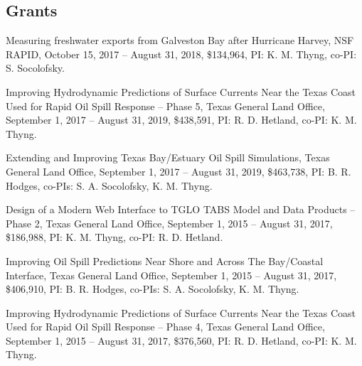 \documentclass[10pt,letterpaper]{article}
\renewenvironment{itemize}{
  \begin{list}{}{
    \setlength{\leftmargin}{1.5em}
    \setlength{\itemsep}{0.25em}
    \setlength{\parskip}{0pt}
    \setlength{\parsep}{0.25em}
  }
}{
  \end{list}
}
\begin{document}
\subsection*{Grants}
\begin{itemize}
  \item Measuring freshwater exports from Galveston Bay after Hurricane Harvey, NSF RAPID, October 15, 2017 -- August 31, 2018, \$134,964, PI: K. M. Thyng, co-PI: S. Socolofsky.
\item Improving Hydrodynamic Predictions of Surface Currents Near the Texas Coast Used for Rapid Oil Spill Response -- Phase 5, Texas General Land Office, September 1, 2017 -- August 31, 2019, \$438,591, PI: R. D. Hetland, co-PI: K. M. Thyng.
    \item Extending and Improving Texas Bay/Estuary Oil Spill Simulations, Texas        General Land Office, September 1, 2017 -- August 31, 2019, \$463,738, PI: B. R. Hodges, co-PIs: S. A. Socolofsky, K. M. Thyng.
  \item Design of a Modern Web Interface to TGLO TABS Model and Data Products -- Phase 2, Texas General Land Office, September 1, 2015 -- August 31, 2017, \$186,988, PI: K. M. Thyng, co-PI: R. D. Hetland.
  \item Improving Oil Spill Predictions Near Shore and Across The Bay/Coastal Interface, Texas General Land Office, September 1, 2015 -- August 31, 2017, \$406,910, PI: B. R. Hodges, co-PIs: S. A. Socolofsky, K. M. Thyng.
  \item Improving Hydrodynamic Predictions of Surface Currents Near the Texas Coast Used for Rapid Oil Spill Response -- Phase 4, Texas General Land Office, September 1, 2015 -- August 31, 2017, \$376,560, PI: R. D. Hetland, co-PI: K. M. Thyng.
\end{itemize}


\end{document}
